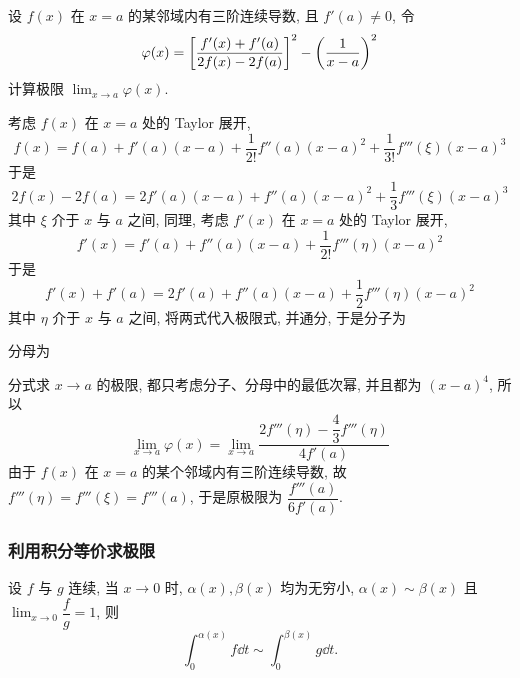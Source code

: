\begin{example}
    设 $f(x)$ 在 $x=a$ 的某邻域内有三阶连续导数, 且 $f'(a)\neq0$, 令 $$\varphi(x)=\qty[\dfrac{f'(x)+f'(a)}{2f(x)-2f(a)}]^2-\qty(\dfrac{1}{x-a})^2$$
    计算极限 $\displaystyle\lim_{x\to a}\varphi(x).$
\end{example}
\begin{solution}
    考虑 $f(x)$ 在 $x=a$ 处的 Taylor 展开, $$f(x)=f(a)+f'(a)(x-a)+\dfrac{1}{2!}f''(a)(x-a)^2+\dfrac{1}{3!}f'''(\xi)(x-a)^3$$
    于是 $$2f(x)-2f(a)=2f'(a)(x-a)+f''(a)(x-a)^2+\dfrac{1}{3}f'''(\xi)(x-a)^3$$
    其中 $\xi$ 介于 $x$ 与 $a$ 之间, 同理, 考虑 $f'(x)$ 在 $x=a$ 处的 Taylor 展开, $$f'(x)=f'(a)+f''(a)(x-a)+\dfrac{1}{2!}f'''(\eta)(x-a)^2$$
    于是 $$f'(x)+f'(a)=2f'(a)+f''(a)(x-a)+\dfrac{1}{2}f'''(\eta)(x-a)^2$$
    其中 $\eta$ 介于 $x$ 与 $a$ 之间, 将两式代入极限式, 并通分, 于是分子为
    分母为
    分式求 $x\to a$ 的极限, 都只考虑分子、分母中的最低次幂, 并且都为 $(x-a)^4$, 所以
    $$\lim_{x\to a}\varphi(x)=\lim_{x\to a}\dfrac{2f'''(\eta)-\dfrac{4}{3}f'''(\eta)}{4f'(a)}$$
    由于 $f(x)$ 在 $x=a$ 的某个邻域内有三阶连续导数, 故 $f'''(\eta)=f'''(\xi)=f'''(a)$, 于是原极限为 $\dfrac{f'''(a)}{6f'(a)}.$
\end{solution}

\subsubsection{利用积分等价求极限}

\begin{theorem}[等价积分]
    \label{fgintintsimsim}
    设 $f$ 与 $g$ 连续, 当 $x\to0$ 时, $\alpha(x),\beta(x)$ 均为无穷小, $\alpha(x)\sim\beta(x)$ 且 $\displaystyle\lim_{x\to0}\dfrac{f}{g}=1$, 则
    $$\int_{0}^{\alpha(x)}f\dd t\sim\int_{0}^{\beta(x)}g\dd t.$$
\end{theorem}

